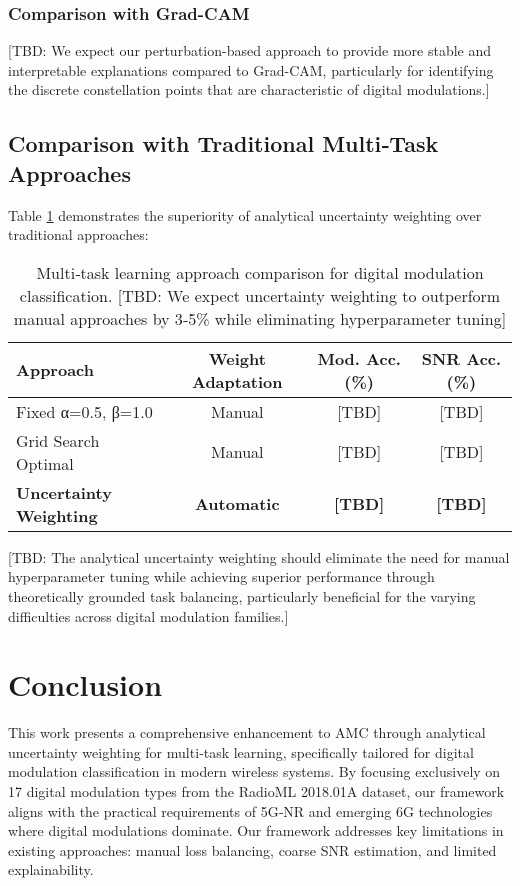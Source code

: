 \documentclass{ELSP}
\begin{document}
\subsubsection{Comparison with Grad-CAM}

[TBD: We expect our perturbation-based approach to provide more stable and interpretable explanations compared to Grad-CAM, particularly for identifying the discrete constellation points that are characteristic of digital modulations.]

\subsection{Comparison with Traditional Multi‑Task Approaches}

Table \ref{tab:mtl_comparison} demonstrates the superiority of analytical uncertainty weighting over traditional approaches:

\begin{table}[H]
\centering
\begin{tabular}{lccc}
\toprule
\textbf{Approach} & \textbf{Weight Adaptation} & \textbf{Mod. Acc. (\%)} & \textbf{SNR Acc. (\%)} \\
\midrule
Fixed α=0.5, β=1.0 & Manual & [TBD] & [TBD] \\
Grid Search Optimal & Manual & [TBD] & [TBD] \\
\textbf{Uncertainty Weighting} & \textbf{Automatic} & \textbf{[TBD]} & \textbf{[TBD]} \\
\bottomrule
\end{tabular}
\caption{Multi‑task learning approach comparison for digital modulation classification. [TBD: We expect uncertainty weighting to outperform manual approaches by 3‑5\% while eliminating hyperparameter tuning]}
\label{tab:mtl_comparison}
\end{table}

[TBD: The analytical uncertainty weighting should eliminate the need for manual hyperparameter tuning while achieving superior performance through theoretically grounded task balancing, particularly beneficial for the varying difficulties across digital modulation families.]

\section{Conclusion}

This work presents a comprehensive enhancement to AMC through analytical uncertainty weighting for multi‑task learning, specifically tailored for digital modulation classification in modern wireless systems. By focusing exclusively on 17 digital modulation types from the RadioML 2018.01A dataset, our framework aligns with the practical requirements of 5G‑NR and emerging 6G technologies where digital modulations dominate. Our framework addresses key limitations in existing approaches: manual loss balancing, coarse SNR estimation, and limited explainability.
\end{document}
